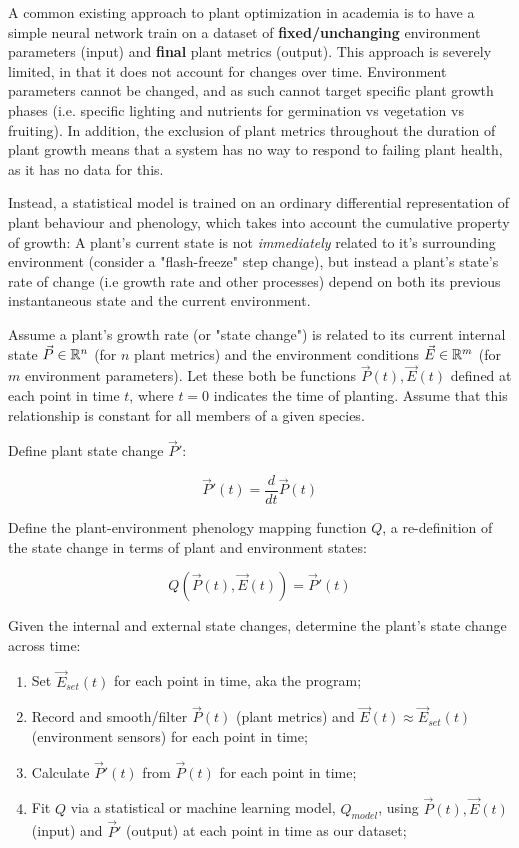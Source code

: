\documentclass{../tex/report}
\begin{document}
\begin{spacing}{0.5}
A common existing approach to plant optimization in academia is to have a simple neural network train on a dataset of \textbf{fixed/unchanging} environment parameters (input) and \textbf{final} plant metrics (output). This approach is severely limited, in that it does not account for changes over time. Environment parameters cannot be changed, and as such cannot target specific plant growth phases (i.e. specific lighting and nutrients for germination vs vegetation vs fruiting). In addition, the exclusion of plant metrics throughout the duration of plant growth means that a system has no way to respond to failing plant health, as it has no data for this.

Instead, a statistical model is trained on an ordinary differential representation of plant behaviour and phenology, which takes into account the cumulative property of growth: A plant's current state is not \textit{immediately} related to it's surrounding environment (consider a "flash-freeze" step change), but instead a plant's state's rate of change (i.e growth rate and other processes) depend on both its previous instantaneous state and the current environment.

Assume a plant's growth rate (or "state change") is related to its current internal state $\vec P \in \mathbb R^n$ (for $n$ plant metrics) and the environment conditions $\vec E \in \mathbb R^m$ (for $m$ environment parameters). Let these both be functions $\vec P (t),\vec E(t)$ defined at each point in time $t$, where $t=0$ indicates the time of planting. Assume that this relationship is constant for all members of a given species.

Define plant state change $\vec P'$: 

$$\vec P'(t) = \frac{d}{dt}\vec P(t)$$

Define the plant-environment phenology mapping function $Q$, a re-definition of the state change in terms of plant and environment states: 

$$Q(\vec P(t), \vec E(t))=\vec P'(t)$$ 

Given the internal and external state changes, determine the plant's state change across time:

\begin{enumerate}
    \item Set $\vec E_{set}(t)$ for each point in time, aka the program;
    \item Record and smooth/filter $\vec P(t)$ (plant metrics) and $\vec E(t)\approx \vec E_{set}(t)$ (environment sensors) for each point in time;
    \item Calculate $\vec P'(t)$ from $\vec P(t)$ for each point in time;
    \item Fit $Q$ via a statistical or machine learning model, $Q_{model}$, using $\vec P(t),\vec E(t)$ (input) and $\vec P'$ (output) at each point in time as our dataset;
\end{enumerate}


\end{spacing}
\end{document}
